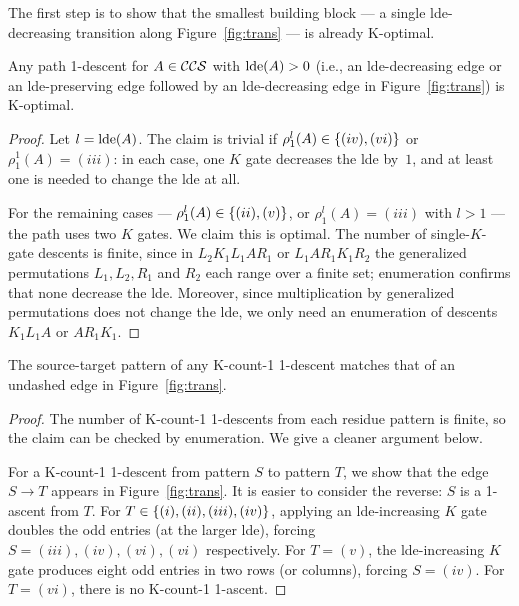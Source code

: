 \documentclass[reprint,amsmath,amssymb,aps,pra]{revtex4-2}
\begin{document}
The first step is to show that the smallest building block — a
single lde-decreasing transition along Figure~\ref{fig:trans} — is
already K-optimal.

\begin{lemma}
  Any path 1-descent for $A\in {\mathcal{CCS}}$ with $\operatorname{lde}(A)>0$ (i.e., an
  lde-decreasing edge or an lde-preserving edge followed by an
  lde-decreasing edge in Figure~\ref{fig:trans}) is K-optimal.
\end{lemma}
\begin{proof}
  Let $l=\operatorname{lde}(A)$. The claim is trivial if
  $\rho^l_1(A) \in \left\{(iv),(vi)\right\}$ or $\rho^1_1(A)=(iii)$: in each
  case, one $K$ gate decreases the lde by~$1$, and at least one is
  needed to change the lde at all.

  For the remaining cases — $\rho^l_1(A) \in \left\{(ii),(v)\right\}$, or
  $\rho^l_1(A)=(iii)$ with $l>1$ — the path uses two $K$ gates. We
  claim this is optimal. The number of single-$K$-gate descents is
  finite, since in $L_2K_1L_1AR_1$ or $L_1AR_1K_1R_2$ the generalized
  permutations $L_1,L_2,R_1$ and $R_2$ each range over a finite set;
  enumeration confirms that none decrease the lde. Moreover, since
  multiplication by generalized permutations does not change the lde,
  we only need an enumeration of descents $K_1L_1A$ or $AR_1K_1$.
\end{proof}

\begin{lemma}
  The source-target pattern of any K-count-1 1-descent matches that of
  an undashed edge in Figure~\ref{fig:trans}.
\end{lemma}

\begin{proof}
  The number of K-count-1 1-descents from each residue pattern is
  finite, so the claim can be checked by enumeration. We give a
  cleaner argument below.

  For a K-count-1 1-descent from pattern $S$ to pattern $T$, we show
  that the edge $S \rightarrow T$ appears in
  Figure~\ref{fig:trans}. It is easier to consider the reverse: $S$ is
  a 1-ascent from $T$. For $T \in \left\{(i),(ii),(iii),(iv)\right\}$, applying
  an lde-increasing $K$ gate doubles the odd entries (at the larger
  lde), forcing $S=(iii),(iv),(vi),(vi)$ respectively. For $T=(v)$,
  the lde-increasing $K$ gate produces eight odd entries in two rows
  (or columns), forcing $S=(iv)$. For $T=(vi)$, there is no K-count-1
  1-ascent.
\end{proof}
\end{document}
